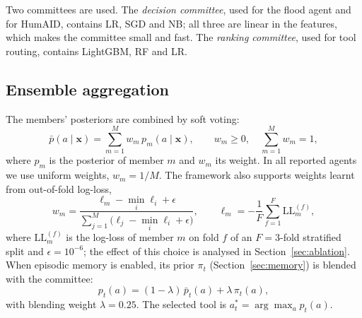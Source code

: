 \documentclass[journal]{IEEEtran}
\begin{document}
Two committees are used. The \emph{decision committee}, used for the flood
agent and for HumAID, contains LR, SGD and NB; all three are linear in the
features, which makes the committee small and fast. The \emph{ranking
committee}, used for tool routing, contains LightGBM, RF and LR.

\subsection{Ensemble aggregation}\label{sec:aggregation}
The members' posteriors are combined by soft voting:
\begin{equation}
\bar{p}(a\mid\mathbf{x})=\sum_{m=1}^{M}w_m\,p_m(a\mid\mathbf{x}),
\qquad w_m\geq0,\quad\sum_{m=1}^{M}w_m=1,
\label{eq:vote}
\end{equation}
where $p_m$ is the posterior of member $m$ and $w_m$ its weight. In all reported
agents we use uniform weights, $w_m=1/M$. The framework also supports weights
learnt from out-of-fold log-loss,
\begin{equation}
w_m=\frac{\ell_m-\min_i\ell_i+\epsilon}{\sum_{j=1}^{M}\big(\ell_j-\min_i\ell_i+\epsilon\big)},
\qquad
\ell_m=-\frac{1}{F}\sum_{f=1}^{F}\mathrm{LL}_m^{(f)},
\label{eq:weights}
\end{equation}
where $\mathrm{LL}_m^{(f)}$ is the log-loss of member $m$ on fold $f$ of an
$F=3$-fold stratified split and $\epsilon=10^{-6}$; the effect of this choice is
analysed in Section~\ref{sec:ablation}. When episodic memory is enabled, its
prior $\pi_t$ (Section~\ref{sec:memory}) is blended with the committee:
\begin{equation}
p_t(a)=(1-\lambda)\,\bar{p}_t(a)+\lambda\,\pi_t(a),
\label{eq:blend}
\end{equation}
with blending weight $\lambda=0.25$. The selected tool is
$a^\ast_t=\arg\max_{a}p_t(a)$.
\end{document}
